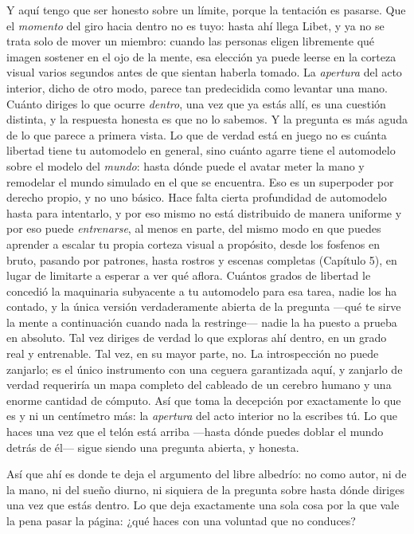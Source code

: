 \documentclass[11pt, twoside, openright]{book}
\begin{document}
Y aquí tengo que ser honesto sobre un límite, porque la tentación es pasarse. Que el \textit{momento} del giro hacia dentro no es tuyo: hasta ahí llega Libet, y ya no se trata solo de mover un miembro: cuando las personas eligen libremente qué imagen sostener en el ojo de la mente, esa elección ya puede leerse en la corteza visual varios segundos antes de que sientan haberla tomado. La \textit{apertura} del acto interior, dicho de otro modo, parece tan predecidida como levantar una mano. Cuánto diriges lo que ocurre \textit{dentro}, una vez que ya estás allí, es una cuestión distinta, y la respuesta honesta es que no lo sabemos. Y la pregunta es más aguda de lo que parece a primera vista. Lo que de verdad está en juego no es cuánta libertad tiene tu automodelo en general, sino cuánto agarre tiene el automodelo sobre el modelo del \textit{mundo}: hasta dónde puede el avatar meter la mano y remodelar el mundo simulado en el que se encuentra. Eso es un superpoder por derecho propio, y no uno básico. Hace falta cierta profundidad de automodelo hasta para intentarlo, y por eso mismo no está distribuido de manera uniforme y por eso puede \textit{entrenarse}, al menos en parte, del mismo modo en que puedes aprender a escalar tu propia corteza visual a propósito, desde los fosfenos en bruto, pasando por patrones, hasta rostros y escenas completas (Capítulo 5), en lugar de limitarte a esperar a ver qué aflora. Cuántos grados de libertad le concedió la maquinaria subyacente a tu automodelo para esa tarea, nadie los ha contado, y la única versión verdaderamente abierta de la pregunta ---qué te sirve la mente a continuación cuando nada la restringe--- nadie la ha puesto a prueba en absoluto. Tal vez diriges de verdad lo que exploras ahí dentro, en un grado real y entrenable. Tal vez, en su mayor parte, no. La introspección no puede zanjarlo; es el único instrumento con una ceguera garantizada aquí, y zanjarlo de verdad requeriría un mapa completo del cableado de un cerebro humano y una enorme cantidad de cómputo. Así que toma la decepción por exactamente lo que es y ni un centímetro más: la \textit{apertura} del acto interior no la escribes tú. Lo que haces una vez que el telón está arriba ---hasta dónde puedes doblar el mundo detrás de él--- sigue siendo una pregunta abierta, y honesta.

Así que ahí es donde te deja el argumento del libre albedrío: no como autor, ni de la mano, ni del sueño diurno, ni siquiera de la pregunta sobre hasta dónde diriges una vez que estás dentro. Lo que deja exactamente una sola cosa por la que vale la pena pasar la página: ¿qué haces con una voluntad que no conduces?
\end{document}
